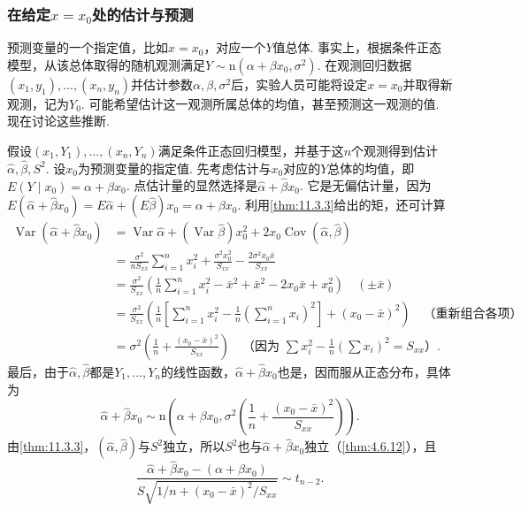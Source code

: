 \subsubsection{在给定\texorpdfstring{$x=x_0$}{x=x₀}处的估计与预测}\label{sec:11.3.5}
预测变量的一个指定值，比如$x=x_0$，对应一个$Y$值总体. 事实上，根据条件正态模型，从该总体取得的随机观测满足$Y\sim\mathrm n(\alpha+\beta x_0,\sigma^2)$. 在观测回归数据$(x_1,y_1),\allowbreak\ldots,\allowbreak(x_n,y_n)$并估计参数$\alpha,\beta,\sigma^2$后，实验人员可能将设定$x=x_0$并取得新观测，记为$Y_0$. 可能希望估计这一观测所属总体的均值，甚至预测这一观测的值. 现在讨论这些推断.

假设$(x_1,Y_1),\allowbreak\ldots,\allowbreak(x_n,Y_n)$满足条件正态回归模型，并基于这$n$个观测得到估计$\hat\alpha,\hat\beta,S^2$. 设$x_0$为预测变量的指定值. 先考虑估计与$x_0$对应的$Y$总体的均值，即$E(Y\mid x_0)=\alpha+\beta x_0$. 点估计量的显然选择是$\hat\alpha+\hat\beta x_0$. 它是无偏估计量，因为$E(\hat\alpha+\hat\beta x_0)=E\hat\alpha+(E\hat\beta)x_0=\alpha+\beta x_0$. 利用\autoref{thm:11.3.3}给出的矩，还可计算
\begin{align*}
\operatorname{Var}(\hat\alpha+\hat\beta x_0)
&=\operatorname{Var}\hat\alpha+(\operatorname{Var}\hat\beta)x_0^2+2x_0\operatorname{Cov}(\hat\alpha,\hat\beta)\\
&=\frac{\sigma^2}{nS_{xx}}\sum_{i=1}^nx_i^2+\frac{\sigma^2x_0^2}{S_{xx}}-\frac{2\sigma^2x_0\bar x}{S_{xx}}\\
&=\frac{\sigma^2}{S_{xx}}\left(\frac1n\sum_{i=1}^nx_i^2-\bar x^2+\bar x^2-2x_0\bar x+x_0^2\right)
\quad(\pm\bar x)\\
&=\frac{\sigma^2}{S_{xx}}\left(\frac1n\left[\sum_{i=1}^nx_i^2-\frac1n\left(\sum_{i=1}^nx_i\right)^2\right]+(x_0-\bar x)^2\right)
\quad\text{（重新组合各项）}\\
&=\sigma^2\left(\frac1n+\frac{(x_0-\bar x)^2}{S_{xx}}\right)
\quad\text{（因为 }\sum x_i^2-\tfrac1n(\sum x_i)^2=S_{xx}\text{）}.
\end{align*}
最后，由于$\hat\alpha,\hat\beta$都是$Y_1,\ldots,Y_n$的线性函数，$\hat\alpha+\hat\beta x_0$也是，因而服从正态分布，具体为
\begin{equation}\label{eq:11.3.39}
\hat\alpha+\hat\beta x_0\sim\mathrm n\left(\alpha+\beta x_0,\sigma^2\left(\frac1n+\frac{(x_0-\bar x)^2}{S_{xx}}\right)\right).
\end{equation}
由\autoref{thm:11.3.3}，$(\hat\alpha,\hat\beta)$与$S^2$独立，所以$S^2$也与$\hat\alpha+\hat\beta x_0$独立（\autoref{thm:4.6.12}），且
$$\frac{\hat\alpha+\hat\beta x_0-(\alpha+\beta x_0)}{S\sqrt{1/n+(x_0-\bar x)^2/S_{xx}}}\sim t_{n-2}.$$
